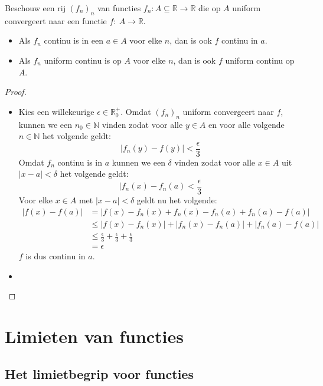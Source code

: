 \documentclass[main.tex]{subfiles}
\begin{document}
\begin{st}
  Beschouw een rij $(f_{n})_{n}$ van functies $f_{n}: A \subseteq \mathbb{R} \rightarrow \mathbb{R}$ die op $A$ uniform convergeert naar een functie $f:\ A \rightarrow \mathbb{R}$.
  \begin{itemize}
  \item Als $f_{n}$ continu is in een $a\in A$ voor elke $n$, dan is ook $f$ continu in $a$.
  \item Als $f_{n}$ uniform continu is op $A$ voor elke $n$, dan is ook $f$ uniform continu op $A$. 
  \end{itemize}

  \begin{proof}
    \begin{itemize}
    \item 
      Kies een willekeurige $\epsilon \in \mathbb{R}_{0}^{+}$.
      Omdat $(f_{n})_{n}$ uniform convergeert naar $f$, kunnen we een $n_{0}\in \mathbb{N}$ vinden zodat voor alle $y\in A$ en voor alle volgende $n\in \mathbb{N}$ het volgende geldt:
      \[ |f_{n}(y)-f(y)|<\frac{\epsilon}{3} \]
      Omdat $f_{n}$ continu is in $a$ kunnen we een $\delta$ vinden
      zodat voor alle $x\in A$ uit $|x-a|<\delta$ het volgende geldt:
      \[ |f_{n}(x) - f_{n}(a) < \frac{\epsilon}{3} \]
      Voor elke $x\in A$ met $|x-a|<\delta$ geldt nu het volgende:
      \[
      \begin{array}{rl}
        |f(x)-f(a)| &= |f(x) - f_{n}(x) + f_{n}(x) - f_{n}(a) + f_{n}(a) - f(a)|\\
                    &\le |f(x) - f_{n}(x)| + |f_{n}(x) - f_{n}(a)| + |f_{n}(a) - f(a)|\\
                    &\le \frac{\epsilon}{3} + \frac{\epsilon}{3} + \frac{\epsilon}{3}\\
                    &= \epsilon
      \end{array}
      \]
      $f$ is dus continu in $a$.
    \item {}
    \end{itemize}
  \end{proof}
\end{st}

\section{Limieten van functies}
\label{sec:limi-van-funct}

\subsection{Het limietbegrip voor functies}
\end{document}
